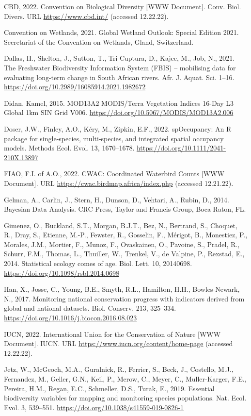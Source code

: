 \documentclass[utf8]{frontiersSCNS}
\begin{document}
CBD, 2022. Convention on Biological Diversity {[}WWW Document{]}. Conv.
Biol. Divers. URL \url{https://www.cbd.int/} (accessed 12.22.22).

Convention on Wetlands, 2021. Global Wetland Outlook: Special Edition
2021. Secretariat of the Convention on Wetlands, Gland, Switzerland.

Dallas, H., Shelton, J., Sutton, T., Tri Cuptura, D., Kajee, M., Job,
N., 2021. The Freshwater Biodiversity Information System (FBIS) --
mobilising data for evaluating long-term change in South African rivers.
Afr. J. Aquat. Sci. 1--16.
\url{https://doi.org/10.2989/16085914.2021.1982672}

Didan, Kamel, 2015. MOD13A2 MODIS/Terra Vegetation Indices 16-Day L3
Global 1km SIN Grid V006.
\url{https://doi.org/10.5067/MODIS/MOD13A2.006}

Doser, J.W., Finley, A.O., Kéry, M., Zipkin, E.F., 2022. spOccupancy: An
R package for single‐species, multi‐species, and integrated spatial
occupancy models. Methods Ecol. Evol. 13, 1670--1678.
\url{https://doi.org/10.1111/2041-210X.13897}

FIAO, F.I. of A.O., 2022. CWAC: Coordinated Waterbird Counts {[}WWW
Document{]}. URL \url{https://cwac.birdmap.africa/index.php} (accessed
12.21.22).

Gelman, A., Carlin, J., Stern, H., Dunson, D., Vehtari, A., Rubin, D.,
2014. Bayesian Data Analysis. CRC Press, Taylor and Francis Group, Boca
Raton, FL.

Gimenez, O., Buckland, S.T., Morgan, B.J.T., Bez, N., Bertrand, S.,
Choquet, R., Dray, S., Etienne, M.-P., Fewster, R., Gosselin, F.,
Mérigot, B., Monestiez, P., Morales, J.M., Mortier, F., Munoz, F.,
Ovaskainen, O., Pavoine, S., Pradel, R., Schurr, F.M., Thomas, L.,
Thuiller, W., Trenkel, V., de Valpine, P., Rexstad, E., 2014.
Statistical ecology comes of age. Biol. Lett. 10, 20140698.
\url{https://doi.org/10.1098/rsbl.2014.0698}

Han, X., Josse, C., Young, B.E., Smyth, R.L., Hamilton, H.H.,
Bowles-Newark, N., 2017. Monitoring national conservation progress with
indicators derived from global and national datasets. Biol. Conserv.
213, 325--334. \url{https://doi.org/10.1016/j.biocon.2016.08.023}

IUCN, 2022. International Union for the Conservation of Nature {[}WWW
Document{]}. IUCN. URL \url{https://www.iucn.org/content/home-page}
(accessed 12.22.22).

Jetz, W., McGeoch, M.A., Guralnick, R., Ferrier, S., Beck, J., Costello,
M.J., Fernandez, M., Geller, G.N., Keil, P., Merow, C., Meyer, C.,
Muller-Karger, F.E., Pereira, H.M., Regan, E.C., Schmeller, D.S., Turak,
E., 2019. Essential biodiversity variables for mapping and monitoring
species populations. Nat. Ecol. Evol. 3, 539--551.
\url{https://doi.org/10.1038/s41559-019-0826-1}
\end{document}
